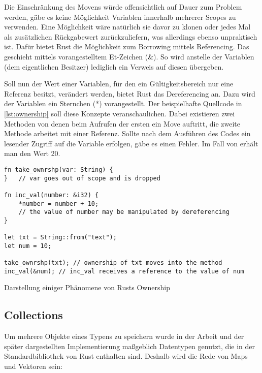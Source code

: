 Die Einschränkung des Movens würde offensichtlich auf Dauer zum Problem werden, gäbe es keine Möglichkeit Variablen innerhalb mehrerer Scopes zu verwenden. Eine Möglichkeit wäre natürlich sie davor zu klonen oder jedes Mal als zusätzlichen Rückgabewert zurückzuliefern, was allerdings ebenso unpraktisch ist. Dafür bietet Rust die Möglichkeit zum \glqq Borrowing\grqq{} mittels \glqq Referencing\grqq. Das geschieht mittels vorangestelltem Et-Zeichen (\&). So wird anstelle der Variablen (dem eigentlichen Besitzer) lediglich ein Verweis auf diesen übergeben.

Soll nun der Wert einer Variablen, für den ein Gültigkeitsbereich nur eine Referenz besitzt, verändert werden, bietet Rust das \glqq Dereferencing\grqq{} an. Dazu wird der Variablen ein Sternchen (*) vorangestellt. Der beispielhafte Quellcode in \ref{lst:ownership} soll diese Konzepte veranschaulichen. Dabei existieren zwei Methoden von denen beim Aufrufen der ersten ein \glqq Move\grqq{} auftritt, die zweite Methode arbeitet mit einer Referenz. Sollte nach dem Ausführen des Codes ein lesender Zugriff auf die Variable  erfolgen, gäbe es einen Fehler. Im Fall von  erhält man den Wert 20.

\begin{listing}[th]
\begin{verbatim}
fn take_ownrshp(var: String) {
}   // var goes out of scope and is dropped

fn inc_val(number: &i32) {
    *number = number + 10;
    // the value of number may be manipulated by dereferencing
}

let txt = String::from("text");
let num = 10;

take_ownrshp(txt); // ownership of txt moves into the method
inc_val(&num); // inc_val receives a reference to the value of num
\end{verbatim}
\label{lst:ownership}
\caption{Darstellung einiger Phänomene von Rusts Ownership}
\end{listing}

\subsection{Collections}

Um mehrere Objekte eines Typens zu speichern wurde in der Arbeit und der später dargestellten Implementierung maßgeblich Datentypen genutzt, die in der Standardbibliothek von Rust enthalten sind. Deshalb wird die Rede von Maps und Vektoren sein:

